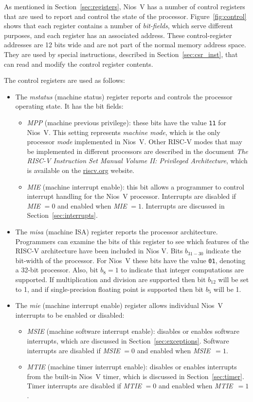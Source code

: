 \documentclass[11pt, twoside, pdftex]{article}
\begin{document}
As mentioned in Section~\ref{sec:registers}, Nios~V has a number of control registers
that are used to report and control the state of the processor. Figure~\ref{fig:control}
shows that each register contains a number of {\it bit-fields}, which serve 
different purposes, and each register has an associated address. These control-register
addresses are 12 bits wide and are not part of the normal memory address space. They  
are used by special instructions, described in Section~\ref{sec:csr_inst}, that can read 
and modify the control register contents. 

The control registers are used as follows:
\vspace{-\baselineskip}
\begin{itemize}
\item The {\it mstatus} (machine status) register reports and controls the
processor operating state. It has the bit fields:
\begin{itemize}
\item {\it MPP} (machine previous privilege): these bits have 
the value \texttt{11} for Nios~V. This setting represents {\it machine mode}, which is
the only processor {\it mode} implemented in Nios~V. Other RISC-V modes that may be
implemented in different processors are described in the document {\it The RISC-V Instruction
Set Manual Volume II: Privileged Architecture}, which is available on the
{\small \href{https://www.riscv.org} {riscv.org}} website. 
\item {\it MIE} (machine interrupt enable): this bit allows a programmer to control
interrupt handling for the Nios~V processor. Interrupts are disabled if 
{\it MIE} $= 0$ and enabled when {\it MIE} $= 1$.  Interrupts are discussed in 
Section~\ref{sec:interrupts}.
\end{itemize}
\item The {\it misa} (machine ISA) register reports the processor architecture.
Programmers can examine the bits of this register to see which features of the RISC-V
architecture have been included in Nios V. Bits $b_{31-30}$ indicate the bit-width of 
the processor. For Nios~V these bits have the value
\texttt{01}, denoting a 32-bit processor. Also, bit $b_8 = 1$ to indicate that integer 
computations are supported. If multiplication and division are supported then bit $b_{12}$
will be set to 1, and if single-precision floating point is supported then bit $b_{5}$
will be 1.
\item The {\it mie} (machine interrupt enable) register allows individual Nios~V
interrupts to be enabled or disabled:
\begin{itemize}
\item {\it MSIE} (machine software interrupt enable): disables or enables software
interrupts, which are discussed in Section~\ref{sec:exceptions}. Software interrupts are
disabled if {\it MSIE} $= 0$ and enabled when {\it MSIE}~$= 1$.
\item {\it MTIE} (machine timer interrupt enable): disables or enables interrupts from the
built-in Nios~V timer, which is discussed in Section~\ref{sec:timer}. 
Timer interrupts are disabled if {\it MTIE} $= 0$ and enabled when {\it MTIE}~$= 1$.


\end{itemize}
\end{itemize}
\end{document}
